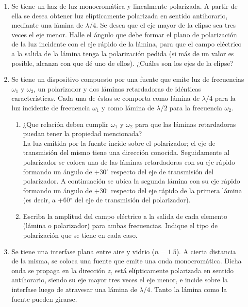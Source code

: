 \documentclass[11pt,spanish]{article}
\begin{document}
\begin{enumerate}

    \item Se tiene un haz de luz monocromática y linealmente polarizada. A
    partir de ella se desea obtener luz elípticamente polarizada en sentido
    antihorario, mediante una lámina de $\lambda/4$. Se desea que el eje
    mayor de la elipse sea tres veces el eje menor. Halle el ángulo que debe
    formar el plano de polarización de la luz incidente con el eje rápido
    de la lámina, para que el campo eléctrico a la salida de la lámina
    tenga la polarización pedida (si más de un valor es posible, alcanza
    con que dé uno de ellos). ¿Cuáles son los ejes de la elipse?


    \item Se tiene un dispositivo compuesto por una fuente que emite luz de
    frecuencias $\omega_{1}$ y $\omega_{2}$, un polarizador y dos láminas
    retardadoras de idénticas características. Cada una de éstas se comporta
    como lámina de $\lambda/4$ para la luz incidente de frecuencia $\omega_{1}$
    y como lámina de $\lambda/2$ para la frecuencia $\omega_{2}$.

    \begin{enumerate}
        \item ¿Que relación deben cumplir $\omega_{1}$ y $\omega_{2}$ para que
        las láminas retardadoras puedan tener la propiedad mencionada? \medskip{}
        \\
        La luz emitida por la fuente incide sobre el polarizador; el eje de
        transmisión del mismo tiene una dirección conocida. Seguidamente al
        polarizador se coloca una de las láminas retardadoras con su eje rápido
        formando un ángulo de +30$^{\circ}$ respecto del eje de transmisión
        del polarizador. A continuación se ubica la segunda lámina con su
        eje rápido formando un ángulo de +30$^{\circ}$ respecto del eje rápido
        de la primera lámina (es decir, a +60$^{\circ}$ del eje de transmisión
        del polarizador).

        \item Escriba la amplitud del campo eléctrico a la salida de cada
        elemento (lámina o polarizador) para ambas frecuencias. Indique el tipo
        de polarización que se tiene en cada caso. 
    \end{enumerate}
    

    \item Se tiene una interfase plana entre aire y vidrio ($n=1.5$). A cierta
    distancia de la misma, se coloca una fuente que emite una onda
    monocromática. Dicha onda se propaga en la dirección $z$, está elípticamente
    polarizada en sentido antihorario, siendo su eje mayor tres veces el eje
    menor, e incide sobre la interfase luego de atravesar una lámina de
    $\lambda/4$. Tanto la lámina como la fuente pueden girarse. 
    

\end{enumerate}
\end{document}
